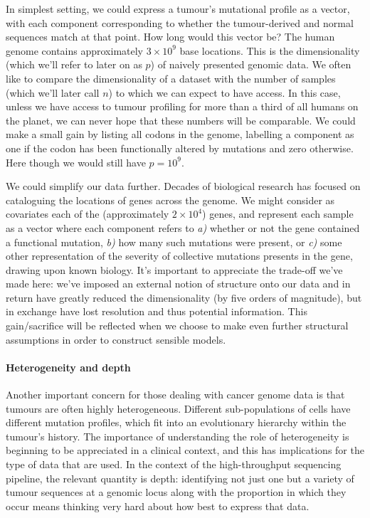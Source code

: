 \documentclass[thesis.tex]{subfiles}
\begin{document}
In simplest setting, we could express a tumour's mutational profile as a vector, with each component corresponding to whether the tumour-derived and normal sequences match at that point. How long would this vector be? The human genome contains approximately $3\times 10^9$ base locations. This is the dimensionality (which we'll refer to later on as $p$) of naively presented genomic data. We often like to compare the dimensionality of a dataset with the number of samples (which we'll later call $n$) to which we can expect to have access. In this case, unless we have access to tumour profiling for more than a third of all humans on the planet, we can never hope that these numbers will be comparable. We could make a small gain by listing all codons in the genome, labelling a component as one if the codon has been functionally altered by mutations and zero otherwise. Here though we would still have $p = 10^9$.

We could simplify our data further. Decades of biological research has focused on cataloguing the locations of genes across the genome. We might consider as covariates each of the (approximately $2\times 10^4$) genes, and represent each sample as a vector where each component refers to \textit{a)} whether or not the gene contained a functional mutation, \textit{b)} how many such mutations were present, or \textit{c)} some other representation of the severity of collective mutations presents in the gene, drawing upon known biology. It's important to appreciate the trade-off we've made here: we've imposed an external notion of structure onto our data and in return have greatly reduced the dimensionality (by five orders of magnitude), but in exchange have lost resolution and thus potential information. This gain/sacrifice will be reflected when we choose to make even further structural assumptions in order to construct sensible models.

\paragraph{Heterogeneity and depth}
Another important concern for those dealing with cancer genome data is that tumours are often highly heterogeneous. Different sub-populations of cells have different mutation profiles, which fit into an evolutionary hierarchy within the tumour's history. The importance of understanding the role of heterogeneity is beginning to be appreciated in a clinical context, and this has implications for the type of data that are used. In the context of the high-throughput sequencing pipeline, the relevant quantity is depth: identifying not just one but a variety of tumour sequences at a genomic locus along with the proportion in which they occur means thinking very hard about how best to express that data.
\end{document}
